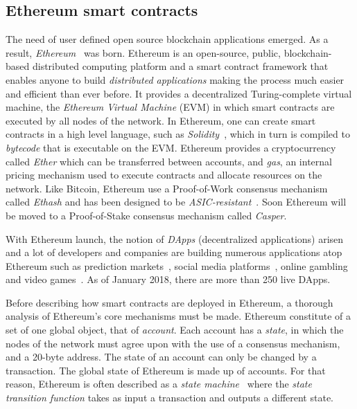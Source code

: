 \subsection{Ethereum smart contracts}
\label{smart_contracts:ethereum}

The need of user defined open source blockchain applications emerged. As a result, \textit{Ethereum}~\cite{ethereum_yellowpaper, ethereum_whitepaper} was born. Ethereum is an open-source, public, blockchain-based distributed computing platform and a smart contract framework that enables anyone to build \textit{distributed applications} making the process much easier and efficient than ever before. It provides a decentralized Turing-complete virtual machine, the \textit{Ethereum Virtual Machine} (EVM) in which smart contracts are executed by all nodes of the network. In Ethereum, one can create smart contracts in a high level language, such as \textit{Solidity}~\cite{solidity}, which in turn is compiled to \textit{bytecode} that is executable on the EVM. Ethereum provides a cryptocurrency called \textit{Ether} which can be transferred between accounts, and \textit{gas}, an internal pricing mechanism used to execute contracts and allocate resources on the network. Like Bitcoin, Ethereum use a Proof-of-Work consensus mechanism called \textit{Ethash} and has been designed to be \textit{ASIC-resistant}~\cite{ethash}. Soon Ethereum will be moved to a Proof-of-Stake consensus mechanism called \textit{Casper}.

With Ethereum launch, the notion of \textit{DApps} (decentralized applications) arisen
and a lot of developers and companies are building numerous applications atop Ethereum such as prediction markets~\cite{augur,gnosis}, social media platforms~\cite{akasha,backfeed},
online gambling~\cite{etheroll,coinpoker} and video games~\cite{cryptokitties}. As of January 2018, there are more than 250 live DApps.

Before describing how smart contracts are deployed in Ethereum, a thorough analysis of Ethereum's core mechanisms must be made. Ethereum constitute of a set of one global object, that of \textit{account}. Each account has a \textit{state}, in which the nodes of the network must agree upon with the use of a consensus mechanism, and a 20-byte address. The state of an account can only be changed by a transaction. The global state of Ethereum is made up of accounts. For that reason, Ethereum is often described as a \textit{state machine}~\cite{ethereum_whitepaper} where the \textit{state transition function} takes as input a transaction and outputs a different state.

